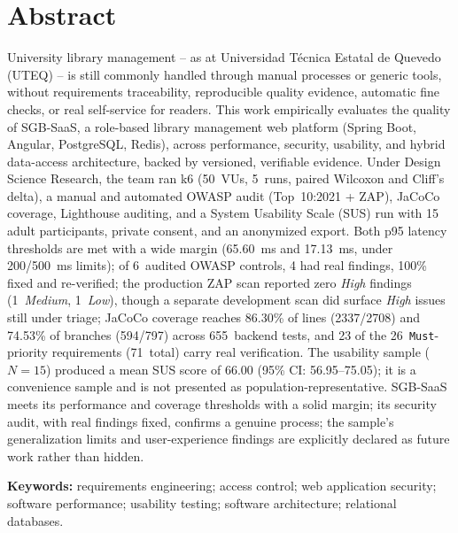 \section*{Abstract}

University library management -- as at Universidad Técnica Estatal de
Quevedo (UTEQ) -- is still commonly handled through manual processes or
generic tools, without requirements traceability, reproducible quality
evidence, automatic fine checks, or real self-service for readers. This
work empirically evaluates the quality of SGB-SaaS, a role-based
library management web platform (Spring Boot, Angular, PostgreSQL,
Redis), across performance, security, usability, and hybrid data-access
architecture, backed by versioned, verifiable evidence. Under Design
Science Research, the team ran k6 (50~VUs, 5~runs, paired Wilcoxon and
Cliff's delta), a manual and automated OWASP audit (Top~10:2021 + ZAP),
JaCoCo coverage, Lighthouse auditing, and a System Usability Scale
(SUS) run with 15 adult participants, private consent, and an anonymized export. Both p95
latency thresholds are met with a wide margin (65.60~ms and 17.13~ms,
under 200/500~ms limits); of 6~audited OWASP controls, 4 had real
findings, 100\% fixed and re-verified; the production ZAP scan reported
zero \emph{High} findings (1~\emph{Medium}, 1~\emph{Low}), though a
separate development scan did surface \emph{High} issues still under
triage; JaCoCo coverage reaches 86.30\% of lines (2337/2708) and 74.53\% of
branches (594/797) across 655~backend tests, and 23 of the
26~\texttt{Must}-priority
requirements (71~total) carry real verification. The usability sample
($N=15$) produced a mean SUS score of 66.00 (95\% CI: 56.95--75.05);
it is a convenience sample and is not presented as population-representative.
SGB-SaaS meets its performance and coverage thresholds with
a solid margin; its security audit, with real findings fixed, confirms
a genuine process; the sample's generalization limits and user-experience
findings are explicitly declared as future work rather than
hidden.

\textbf{Keywords:} requirements engineering; access control; web
application security; software performance; usability testing; software
architecture; relational databases.
